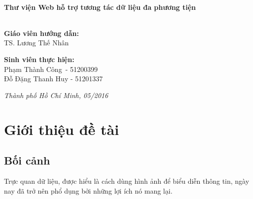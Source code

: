 \documentclass[12pt,a4paper]{article}
\begin{document}
\begin{titlepage}
\HRule \\[0.4cm]
{ \huge \bfseries Thư viện Web hỗ trợ tương tác dữ liệu đa phương tiện}\\[0.4cm] %
\HRule \\[0.8cm]

\begin{flushright}
\begin{minipage}{0.7\textwidth}

\end{minipage}
\end{flushright}

\begin{flushleft} \large
\textbf{Giáo viên hướng dẫn:}\\
\tab[2cm] TS. Lương Thế Nhân\\[1.0cm]
\end{flushleft}

\begin{flushleft} \large
\textbf{Sinh viên thực hiện:}\\
\tab[2cm] Phạm Thành Công\quad \ - 51200399\\
\tab[2cm] Đỗ Đặng Thanh Huy - 51201337\\[1.5cm]
\end{flushleft}


\large \emph{Thành phố Hồ Chí Minh, 05/2016}

\vfill %

\end{titlepage}
\thispagestyle{empty}
\tableofcontents
\thispagestyle{empty}
\newpage
\section{Giới thiệu đề tài}
\subsection{Bối cảnh}
Trực quan dữ liệu, được hiểu là cách dùng hình ảnh để biểu diễn thông tin, ngày nay đã trở nên phổ dụng bởi những lợi ích nó mang lại.
\end{document}
